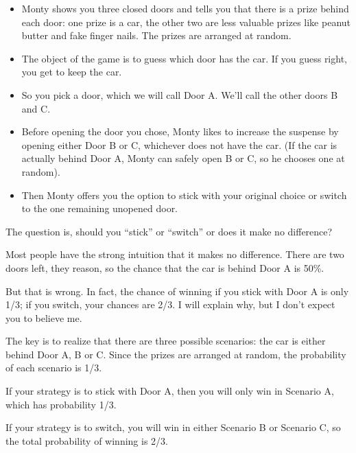 \documentclass[12pt]{book}
\begin{document}
\begin{itemize}

\item Monty shows you three closed doors and tells you that there is a
  prize behind each door: one prize is a car, the other two are less
  valuable prizes like peanut butter and fake finger nails.  The
  prizes are arranged at random.

\item The object of the game is to guess which door has the car.  If
  you guess right, you get to keep the car.

\item So you pick a door, which we will call Door A.  We'll call the
  other doors B and C.

\item Before opening the door you chose, Monty likes to increase the
  suspense by opening either Door B or C, whichever does not
  have the car.  (If the car is actually behind Door A, Monty can
  safely open B or C, so he chooses one at random).

\item Then Monty offers you the option to stick with your original
  choice or switch to the one remaining unopened door.

\end{itemize}

The question is, should you ``stick'' or ``switch'' or does it
make no difference?


Most people have the strong intuition that it makes no difference.
There are two doors left, they reason, so the chance that the car
is behind Door A is 50\%.

But that is wrong.  In fact, the chance of winning if you stick
with Door A is only 1/3; if you switch, your chances are 2/3.
I will explain why, but I don't expect you to believe me.

The key is to realize that there are three possible scenarios:
the car is either behind Door A, B or C.  Since the prizes are
arranged at random, the probability of each scenario is 1/3.

If your strategy is to stick with Door A, then you will only
win in Scenario A, which has probability 1/3.

If your strategy is to switch, you will win in either Scenario
B or Scenario C, so the total probability of winning is 2/3.

\newcommand{\Erdos}{Erd\H{o}s}
\end{document}
